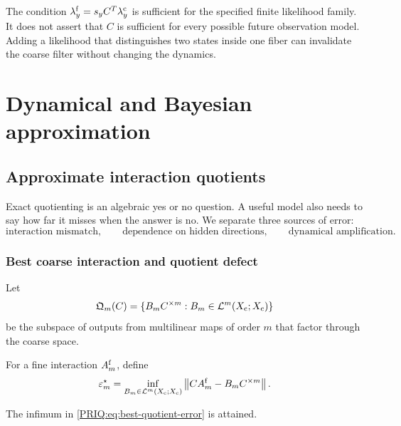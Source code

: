 \begin{PRIQboundary}
The condition $\lambda_y^{\mathrm f}=s_yC^T\lambda_y^{\mathrm c}$ is sufficient for the specified finite likelihood family.  It does not assert that $C$ is sufficient for every possible future observation model.  Adding a likelihood that distinguishes two states inside one fiber can invalidate the coarse filter without changing the dynamics.
\end{PRIQboundary}


\chapter{Dynamical and Bayesian approximation}\label{PRIQ:book:chapter-42}
\section{Approximate interaction quotients}\label{PRIQ:sec:approx-dyn}

Exact quotienting is an algebraic yes or no question.  A useful model also needs to say how far it misses when the answer is no.  We separate three sources of error:
\[
  \text{interaction mismatch},
  \qquad
  \text{dependence on hidden directions},
  \qquad
  \text{dynamical amplification}.
\]

\subsection{Best coarse interaction and quotient defect}
Let
\[
  \mathfrak Q_m(C)
  =
  \{B_mC^{\times m}:B_m\in\mathcal L^m(X_{\mathrm c};X_{\mathrm c})\}
\]
be the subspace of outputs from multilinear maps of order $m$ that factor through the coarse space.

\begin{PRIQdefinition}\label{PRIQ:def:best-quotient-error}
For a fine interaction $A_m^{\mathrm f}$, define
\begin{equation}\label{PRIQ:eq:best-quotient-error}
  \varepsilon_m^\star
  =
  \inf_{B_m\in\mathcal L^m(X_{\mathrm c};X_{\mathrm c})}
  \left\lVert CA_m^{\mathrm f}-B_mC^{\times m}\right\rVert.
\end{equation}
\end{PRIQdefinition}

\begin{PRIQproposition}\label{PRIQ:prop:best-quotient-attained}
The infimum in \eqref{PRIQ:eq:best-quotient-error} is attained.
\end{PRIQproposition}

